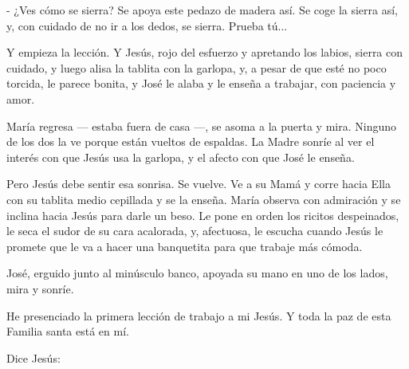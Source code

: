 \documentclass[12pt]{book} %
\begin{document}
- ¿Ves cómo se sierra? Se apoya este pedazo de madera así. Se coge la sierra así, y, con cuidado de no ir a los dedos, se sierra. Prueba tú... 

Y empieza la lección. Y Jesús, rojo del esfuerzo y apretando los labios, sierra con cuidado, y luego alisa la tablita con la garlopa, y, a pesar de que esté no poco torcida, le parece bonita, y José le alaba y le enseña a trabajar, con paciencia y amor. 

María regresa — estaba fuera de casa —, se asoma a la puerta y mira. Ninguno de los dos la ve porque están vueltos de espaldas. La Madre sonríe al ver el interés con que Jesús usa la garlopa, y el afecto con que José le enseña. 

Pero Jesús debe sentir esa sonrisa. Se vuelve. Ve a su Mamá y corre hacia Ella con su tablita medio cepillada y se la enseña. María observa con admiración y se inclina hacia Jesús para darle un beso. Le pone en orden los ricitos despeinados, le seca el sudor de su cara acalorada, y, afectuosa, le escucha cuando Jesús le promete que le va a hacer una banquetita para que trabaje más cómoda. 

José, erguido junto al minúsculo banco, apoyada su mano en uno de los lados, mira y sonríe. 

He presenciado la primera lección de trabajo a mi Jesús. Y toda la paz de esta Familia santa está en mí. 

Dice Jesús: 
\end{document}
